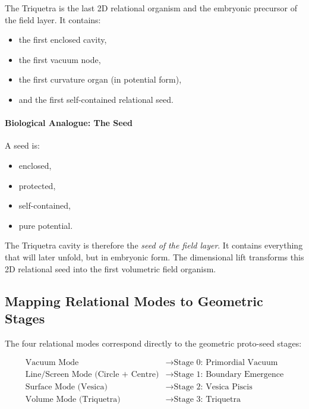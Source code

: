 The Triquetra is the last 2D relational organism and the embryonic precursor of the field layer.  
It contains:

\begin{itemize}
    \item the first enclosed cavity,
    \item the first vacuum node,
    \item the first curvature organ (in potential form),
    \item and the first self-contained relational seed.
\end{itemize}

\paragraph*{Biological Analogue: The Seed}

A seed is:

\begin{itemize}
    \item enclosed,
    \item protected,
    \item self-contained,
    \item pure potential.
\end{itemize}

The Triquetra cavity is therefore the \emph{seed of the field layer}.  
It contains everything that will later unfold, but in embryonic form.  
The dimensional lift transforms this 2D relational seed into the first volumetric field organism.

\subsection{Mapping Relational Modes to Geometric Stages}

The four relational modes correspond directly to the geometric proto-seed stages:

\[
\begin{aligned}
\text{Vacuum Mode} &\rightarrow \text{Stage 0: Primordial Vacuum} \\
\text{Line/Screen Mode (Circle + Centre)} &\rightarrow \text{Stage 1: Boundary Emergence} \\
\text{Surface Mode (Vesica)} &\rightarrow \text{Stage 2: Vesica Piscis} \\
\text{Volume Mode (Triquetra)} &\rightarrow \text{Stage 3: Triquetra}
\end{aligned}
\]

